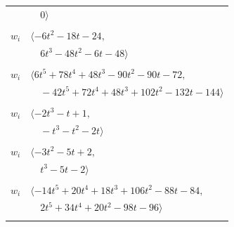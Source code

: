 \documentclass[11pt]{article}
\begin{document}
\begin{longtable}{@{}ll@{}}
 & $\quad 0\rangle$\\
\addlinespace[2pt]
\multicolumn{2}{@{}p{0.97\textwidth}@{}}{$i=25$, $D_i=1$, $\rho_{ij}$: $1{:}2, \allowbreak 2{:}2, \allowbreak 6{:}1, \allowbreak 7{:}2, \allowbreak 9{:}1, \allowbreak 10{:}1, \allowbreak 13{:}2, \allowbreak 19{:}1, \allowbreak 24{:}2, \allowbreak 33{:}2$}\\
$w_i$ & $\langle -6t^{2}-18t-24,$\\
 & $\quad 6t^{3}-48t^{2}-6t-48\rangle$\\
\addlinespace[2pt]
\multicolumn{2}{@{}p{0.97\textwidth}@{}}{$i=26$, $D_i=1$, $\rho_{ij}$: $0{:}1, \allowbreak 1{:}2, \allowbreak 4{:}1, \allowbreak 5{:}2, \allowbreak 6{:}2, \allowbreak 9{:}2, \allowbreak 10{:}2, \allowbreak 12{:}1, \allowbreak 13{:}1, \allowbreak 15{:}1, \allowbreak 20{:}1, \allowbreak 21{:}1, \allowbreak 22{:}2$}\\
$w_i$ & $\langle 6t^{5}+78t^{4}+48t^{3}-90t^{2}-90t-72,$\\
 & $\quad -42t^{5}+72t^{4}+48t^{3}+102t^{2}-132t-144\rangle$\\
\addlinespace[2pt]
\multicolumn{2}{@{}p{0.97\textwidth}@{}}{$i=27$, $D_i=1$, $\rho_{ij}$: $1{:}2, \allowbreak 6{:}2, \allowbreak 19{:}1, \allowbreak 24{:}2, \allowbreak 32{:}2, \allowbreak 33{:}1$}\\
$w_i$ & $\langle -2t^{3}-t+1,$\\
 & $\quad -t^{3}-t^{2}-2t\rangle$\\
\addlinespace[2pt]
\multicolumn{2}{@{}p{0.97\textwidth}@{}}{$i=28$, $D_i=1$, $\rho_{ij}$: $1{:}1, \allowbreak 5{:}1, \allowbreak 13{:}1, \allowbreak 19{:}2, \allowbreak 20{:}2, \allowbreak 21{:}1$}\\
$w_i$ & $\langle -3t^{2}-5t+2,$\\
 & $\quad t^{3}-5t-2\rangle$\\
\addlinespace[2pt]
\multicolumn{2}{@{}p{0.97\textwidth}@{}}{$i=29$, $D_i=1$, $\rho_{ij}$: $1{:}1, \allowbreak 3{:}1, \allowbreak 4{:}1, \allowbreak 9{:}1, \allowbreak 10{:}1, \allowbreak 11{:}2, \allowbreak 14{:}2, \allowbreak 17{:}1, \allowbreak 20{:}1, \allowbreak 22{:}2, \allowbreak 32{:}2, \allowbreak 33{:}2, \allowbreak 34{:}1$}\\
$w_i$ & $\langle -14t^{5}+20t^{4}+18t^{3}+106t^{2}-88t-84,$\\
 & $\quad 2t^{5}+34t^{4}+20t^{2}-98t-96\rangle$\\
\addlinespace[2pt]
\multicolumn{2}{@{}p{0.97\textwidth}@{}}{$i=30$, $D_i=1$, $\rho_{ij}$: $11{:}1, \allowbreak 19{:}2, \allowbreak 31{:}2, \allowbreak 33{:}1$}\\

\end{longtable}
\end{document}
